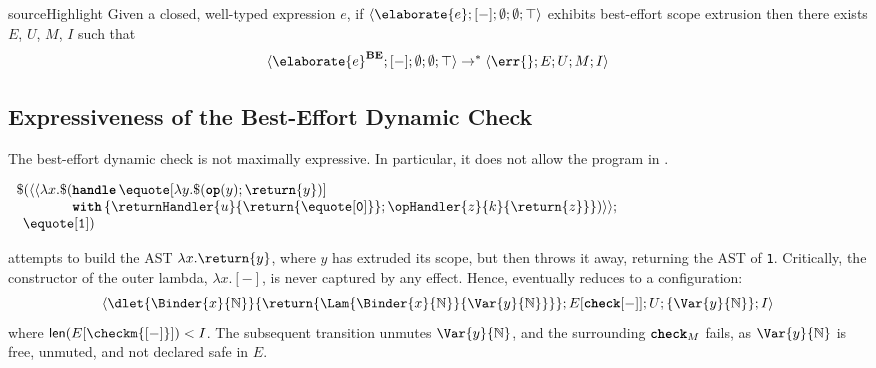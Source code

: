 \begin{theorem}{sourceHighlight} Given a closed, well-typed \sourceLang{} expression $e$, if  $\langle \elaborate{e}; [-]; \emptyset; \emptyset; \top \rangle$ exhibits best-effort scope extrusion 
then there exists $E$, $U$, $M$, $I$ such that \[\langle \elaborate{e}^{\textbf{BE}}; [-]; \emptyset; \emptyset; \top \rangle \to^{*}\langle \err{}; E; U; M; I \rangle\]
\end{theorem}

\subsection{Expressiveness of the Best-Effort Dynamic Check}\label{subsection:best-effort-expressive}
The best-effort dynamic check is not maximally expressive. In particular, it does not allow the program in . 

\begin{code}
  \begin{source}
    $
    \begin{array}{l}
      \$(\langle \langle \lambda x. \$ (\textbf{\texttt{handle}} \, \equote[{\lambda y. \$(\textbf{\texttt{op}}(y); \return{y})}]\\
      \quad\quad\quad\quad\textbf{\texttt{with}} \, \{ \returnHandler{u}{\return{\equote[\texttt{0}]}}; \opHandler{z}{k}{\return{z}}\})\rangle\rangle;\\
      \;\, \equote[{\texttt{1}}])
    \end{array}
    $
  \end{source}
  \label{listing:best-effort-imperfect}
\end{code}

 attempts to build the AST $\lambda x.\return{y}$, where $y$ has extruded its scope, but then throws it away, returning the AST of \texttt{1}. Critically, the constructor of the outer lambda, $\lambda x. [-]$, is never captured by any effect. Hence,  eventually reduces to a configuration: 
\[\langle \dlet{\Binder{x}{\mathbb{N}}}{\return{\Lam{\Binder{x}{\mathbb{N}}}{\Var{y}{\mathbb{N}}}}}; E[\textbf{\texttt{check}}[-]]; U; \{\Var{y}{\mathbb{N}}\} ; I \rangle\]
where $\textsf{len}(E[\checkm{[-]}]) < I$. The subsequent transition unmutes $\Var{y}{\mathbb{N}}$, and the surrounding $\textbf{\texttt{check}}_M$ fails, as $\Var{y}{\mathbb{N}}$ is free, unmuted, and not declared safe in $E$.

